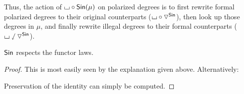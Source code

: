 \documentclass[a4paper]{memoir}
\begin{document}
{\begin{definition}
\begin{itemize}
	\end{itemize}
\end{definition}
Thus, the action of ${\llcorner\hspace{-.4ex}\lrcorner} \circ {\mathsf{Sin}}(\mu)$ on polarized degrees is to first rewrite formal polarized degrees to their original counterparts (${\llcorner\hspace{-.4ex}\lrcorner} \circ {\triangledown}^{\mathsf{Sin}}$), then look up those degrees in $\mu$, and finally rewrite illegal degrees to their formal counterparts (${\llcorner\hspace{-.4ex}\lrcorner} \mathbin{\sswarrow} {\triangledown}^{\mathsf{Sin}}$).
\begin{proposition}
	${\mathsf{Sin}}$ respects the functor laws.
\end{proposition}
\begin{proof}
	This is most easily seen by the explanation given above.
	Alternatively:
	
	Preservation of the identity can simply be computed.


\end{proof}}
\end{document}
